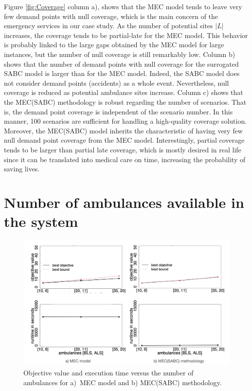 Figure \ref{fig:Coverage} column a), shows that the MEC model tends to leave very few demand points with null coverage, which is the main concern of the emergency services in our case study. As the number of potential sites $|L|$ increases, the coverage tends to be partial-late for the MEC model. This behavior is probably linked to the large gaps obtained by the MEC model for large instances, but the number of null coverage is still remarkably low. Column b) shows that the number of demand points with null coverage for the surrogated SABC model is larger than for the MEC model. Indeed, the SABC model does not consider demand points (accidents) as a whole event. Nevertheless, null coverage is reduced as potential ambulance sites increase. Column c) shows that the MEC(SABC) methodology is robust regarding the number of scenarios. That is, the demand point coverage is independent of the scenario number. In this manner, 100 scenarios are sufficient for handling a high-quality coverage solution. Moreover, the MEC(SABC) model inherits the characteristic of having very few null demand point coverage from the MEC model. Interestingly, partial coverage tends to be larger than partial late coverage, which is mostly desired in real life since it can be translated into medical care on time, increasing the probability of saving lives. 



\section{Number of ambulances available in the system}\label{num amb}


\begin{figure}
    \centering
    \includegraphics[width=0.9\linewidth]{figures/AmbComp.png}
    \caption{Objective value and execution time versus the number of ambulances for a)~MEC model and b) MEC(SABC) methodology.}
    \label{fig:amb}
\end{figure}

